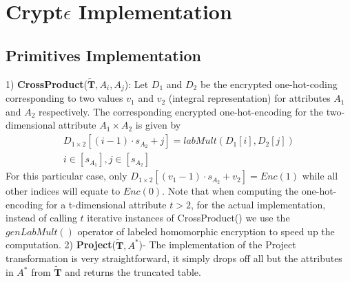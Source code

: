 \section{Crypt$\epsilon$ Implementation }\label{app:im}
\subsection{\system Primitives Implementation}
1) \textbf{\textsf{CrossProduct}}($\tilde{\mathbf{T}}, A_i, A_j$): Let $D_1$ and $D_2$  be the encrypted one-hot-coding corresponding to two  values $v_1$ and $v_2$ (integral representation) for attributes $A_1$ and $A_2$ respectively. The corresponding encrypted one-hot-encoding for the two-dimensional attribute $A_1\times A_2$ is given by  \begin{gather} D_{1\times 2}[(i-1)\cdot s_{A_2}+j] = labMult(D_1[i], D_2[j])\\ i \in [s_{A_1}], j \in [s_{A_2}]\end{gather} For this particular case, only $D_{1 \times 2}[(v_1-1)\cdot s_{A_2}+v_2]=Enc(1)$ while all other indices will equate to $Enc(0)$. Note that when computing the one-hot-encoding for a t-dimensional attribute $t > 2$,  for the actual implementation, instead of calling $t$ iterative instances of \textsf{CrossProduct}() we use the $genLabMult()$ operator of labeled homomorphic encryption to speed up the computation. 
2) \textbf{\textsf{Project}}($\tilde{\mathbf{T}}, A^*$)- The implementation of the \textsf{Project} transformation is very straightforward, it simply drops off all but the attributes in $A^*$ from $\tilde{\mathbf{T}}$ and returns the truncated table.


